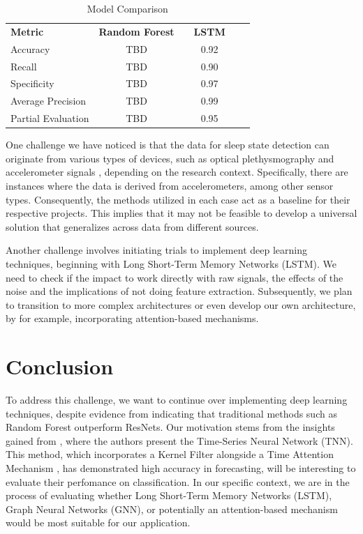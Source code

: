 \documentclass{article}
\begin{document}
\begin{table}[h]
    \centering
    \caption{Model Comparison}
    \label{tab:model_comparison}
    \begin{tabular}{lccccc}
        \hline
        \textbf{Metric} & \textbf{Random Forest} & & \textbf{LSTM} & \\
        \cline{2-5}
        Accuracy & TBD & & 0.92 & \\
        Recall & TBD & & 0.90 & \\
        Specificity & TBD & & 0.97 & \\
        Average Precision & TBD & & 0.99 & \\
        Partial Evaluation & TBD & & 0.95 & \\
        \hline
    \end{tabular}
\end{table}


One challenge we have noticed is that the data for sleep state detection can originate from various types of devices, such as optical plethysmography and accelerometer signals \cite{Beattie_2017}\cite{Fedorin2019}, depending on the research context. Specifically, there are instances where the data is derived from accelerometers, among other sensor types. Consequently, the methods utilized in each case act as a baseline for their respective projects. This implies that it may not be feasible to develop a universal solution that generalizes across data from different sources.

Another challenge involves initiating trials to implement deep learning techniques, beginning with Long Short-Term Memory Networks (LSTM). We need to check if the impact to work directly with raw signals, the effects of the noise and the implications of not doing feature extraction. Subsequently, we plan to transition to more complex architectures or even develop our own architecture, by for example, incorporating attention-based mechanisms.

\section{Conclusion}

To address this challenge, we want to continue over implementing deep learning techniques, despite evidence from \cite{Sundararajan2021} indicating that traditional methods such as Random Forest outperform ResNets. Our motivation stems from the insights gained from \cite{Zhang2023}, where the authors present the Time-Series Neural Network (TNN). This method, which incorporates a Kernel Filter alongside a Time Attention Mechanism \cite{Zhang2023}, has demonstrated high accuracy in forecasting, will be interesting to evaluate their perfomance on classification. In our specific context, we are in the process of evaluating whether Long Short-Term Memory Networks (LSTM), Graph Neural Networks (GNN), or potentially an attention-based mechanism would be most suitable for our application.


{
\small
}
\end{document}

